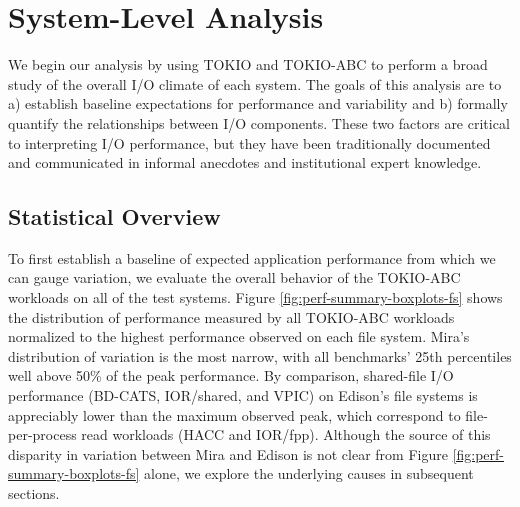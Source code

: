 \section{System-Level Analysis} \label{sec:results}

We begin our analysis by using TOKIO and TOKIO-ABC to perform a broad study of the overall I/O climate of each system.
The goals of this analysis are to
a) establish baseline expectations for performance and variability and
b) formally quantify the relationships between I/O components.
These two factors are critical to interpreting I/O performance, but they have been traditionally documented and communicated in informal anecdotes and institutional expert knowledge.

\subsection{Statistical Overview} \label{sec:results/overview}

To first establish a baseline of expected application performance from which we can gauge variation, we evaluate the overall behavior of the TOKIO-ABC workloads on all of the test systems.
Figure \ref{fig:perf-summary-boxplots-fs} shows the distribution of performance measured by all TOKIO-ABC workloads normalized to the highest performance observed on each file system.
Mira's distribution of variation is the most narrow, with all benchmarks' 25th percentiles well above 50\% of the peak performance.
By comparison, shared-file I/O performance (BD-CATS, IOR/shared, and VPIC) on Edison's file systems is appreciably lower than the maximum observed peak, which correspond to file-per-process read workloads (HACC and IOR/fpp).
Although the source of this disparity in variation between Mira and Edison is not clear from Figure \ref{fig:perf-summary-boxplots-fs} alone, we explore the underlying causes in subsequent sections.

